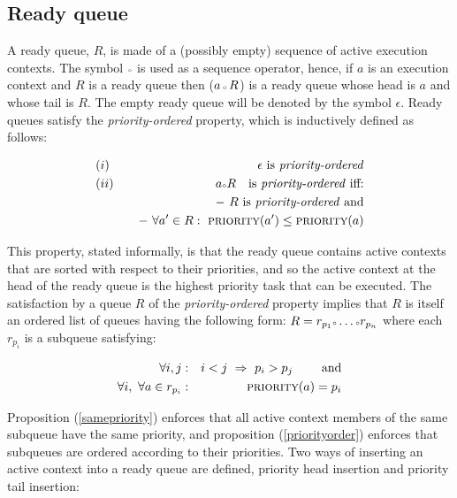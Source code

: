 \subsection{Ready queue}
A ready queue, $R$, is made of a (possibly empty) sequence of active
execution contexts. The symbol ${\scriptscriptstyle \circ}$ is used as a sequence
operator, hence, if $a$ is an execution context and $R$ is a ready
queue then ($a \, {\scriptscriptstyle \circ} \, R$) is a ready queue whose head is $a$
and whose tail is $R$. The empty ready queue will be denoted by the
symbol $\epsilon$. Ready queues satisfy the \emph{priority-ordered}
property, which is inductively defined as follows:

\begin{eqnarray}
  & (i) &  \epsilon \ \text{is \emph{priority-ordered}}\\
  & (ii) & a \smcirc R \ \  \text{ is \emph{priority-ordered} iff:} \\
  & \nonumber & \quad -\ R \text{ is \emph{priority-ordered} and}  \\
  & \nonumber & \quad -\ \forall a' \in R:\ 
  \text{\scshape priority}(a') \leq \text{\scshape priority}(a)
\end{eqnarray}

This property, stated informally, is that the ready queue contains
active contexts that are sorted with respect to their priorities, and
so the active context at the head of the ready queue is the highest
priority task that can be executed.  The satisfaction by a queue $R$
of the \emph{priority-ordered} property implies that $R$ is itself an
ordered list of queues having the following form: $R= r_{p_1} {\scriptscriptstyle \circ}
\ldots {\scriptscriptstyle \circ} r_{p_n}$ where each $r_{p_i}$ is a subqueue satisfying:

\begin{eqnarray}
 \forall i,j &:&  i<j \ \Rightarrow \ p_i > p_j	\ \ \ \ \ \ \  \text{and}	  
 \label{priorityorder}\\ 
 \forall i, \ \forall a \in r_{p_i} & : & \text{\scshape priority}(a) = p_i 
 \label{samepriority}
\end{eqnarray}

Proposition (\ref{samepriority}) enforces that all active context
members of the same subqueue have the same priority, and proposition
(\ref{priorityorder}) enforces that subqueues are ordered according to
their priorities. Two ways of inserting an active context into a ready
queue are defined, priority head insertion and priority tail insertion:\\

